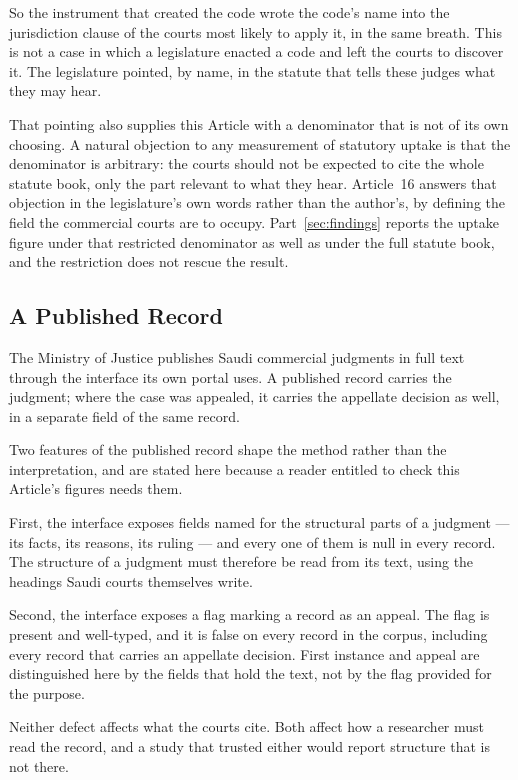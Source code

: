 \documentclass[12pt]{article}
\begin{document}
So the instrument that created the code wrote the code's name into the
jurisdiction clause of the courts most likely to apply it, in the same
breath. This is not a case in which a legislature enacted a code and left the
courts to discover it. The legislature pointed, by name, in the statute that
tells these judges what they may hear.

That pointing also supplies this Article with a denominator that is not of its
own choosing. A natural objection to any measurement of statutory uptake is
that the denominator is arbitrary: the courts should not be expected to cite
the whole statute book, only the part relevant to what they hear. Article~16
answers that objection in the legislature's own words rather than the
author's, by defining the field the commercial courts are to occupy.
Part~\ref{sec:findings}
reports the uptake figure under that restricted denominator as well as under
the full statute book, and the restriction does not rescue the result.

\subsection{A Published Record}

The Ministry of Justice publishes Saudi commercial judgments in full text
through the interface its own portal uses. A published record carries the
judgment; where the case was appealed, it carries the appellate decision as
well, in a separate field of the same record.

Two features of the published record shape the method rather than the
interpretation, and are stated here because a reader entitled to check this
Article's figures needs them.

First, the interface exposes fields named for the structural parts of a
judgment --- its facts, its reasons, its ruling --- and every one of them is
null in every record. The structure of a judgment must therefore be read from
its text, using the headings Saudi courts themselves write.

Second, the interface exposes a flag marking a record as an appeal. The flag
is present and well-typed, and it is false on every record in the corpus,
including every record that carries an appellate decision. First instance and
appeal are distinguished here by the fields that hold the text, not by the
flag provided for the purpose.

Neither defect affects what the courts cite. Both affect how a researcher must
read the record, and a study that trusted either would report structure that
is not there.
\end{document}
